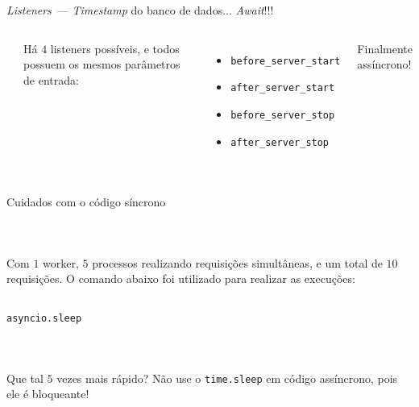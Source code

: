 \documentclass[utf8]{beamer}
\begin{document}
\begin{frame}[fragile]{\emph{Listeners}~---
                       \emph{Timestamp} do banco de dados...
                       \emph{Await}!!!}
  \begin{columns}
    \inputminted{python}{08_listeners.py}

    \fontsize{.8em}{1.2em}\selectfont
    Há $4$ listeners possíveis,
    e todos possuem os mesmos parâmetros
    de entrada:
    \begin{itemize}
      \item \texttt{before_server_start}
      \item \texttt{after_server_start}
      \item \texttt{before_server_stop}
      \item \texttt{after_server_stop}
    \end{itemize}

    \vspace{1em}
    Finalmente assíncrono!
  \end{columns}
  \vfill
  \inputminted{shell}{08_curl.txt}
\end{frame}


\begin{frame}[fragile]{Cuidados com o código síncrono}
  \begin{columns}
    \inputminted{python}{09_sync.py}
    \inputminted{raw}{09_sync_result.txt}
  \end{columns}
  \vfill
  \fontsize{.8em}{1em}\selectfont
  Com $1$ worker, $5$ processos realizando requisições simultâneas,
  e um total de $10$ requisições.
  O comando abaixo foi utilizado para realizar as execuções:
  \inputminted{shell}{09_run.sh}
\end{frame}


\begin{frame}[fragile]{\texttt{asyncio.sleep}}
  \begin{columns}
    \inputminted{python}{09_async.py}
    \inputminted{raw}{09_async_result.txt}
  \end{columns}
  \vfill
  \fontsize{.8em}{1em}\selectfont
  Que tal $5$ vezes mais rápido?
  Não use o \texttt{time.sleep}
  em código assíncrono,
  pois ele é bloqueante!
\end{frame}
\end{document}
